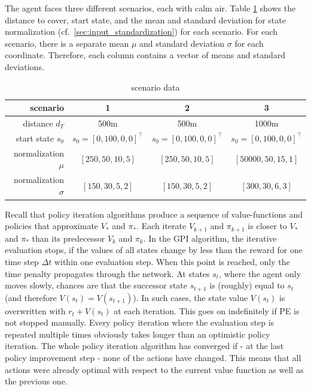 The agent faces three different scenarios, each with calm air. Table \ref{tab:scenario_data} shows the distance to cover, start state, and the mean and standard deviation for state normalization (cf.~\ref{sec:input_standardization}) for each scenario. For each scenario, there is a separate mean $\mu$ and standard deviation $\sigma$ for each coordinate. Therefore, each column contains a vector of means and standard deviations.

\begin{table}[h]
	\begin{center}
		\begin{tabular}{r|c c c}
			scenario & 1 & 2 & 3 \\ \hline
			distance $d_T$ & 500m & 500m & 1000m\\
			start state $s_0$ & $s_0 = [0, 100, 0, 0]^\top$ &  $s_0 = [0, 100, 0, 0]^\top$  &  $s_0 = [0, 100, 0, 0]^\top$  \\
			normalization $\mu$ & $[250, 50, 10, 5]$  &$[250, 50, 10, 5]$ & $[50000, 50, 15, 1]$ \\
			normalization $\sigma$ & $[150, 30, 5, 2]$ & $[150, 30, 5, 2]$ & $[300, 30, 6, 3]$
		\end{tabular}
		\caption{scenario data}
		\label{tab:scenario_data}
	\end{center}
\end{table}

Recall that policy iteration algorithms produce a sequence of value-functions and policies that approximate $V_*$ and $\pi_*$. Each iterate $V_{k+1}$ and $\pi_{k+1}$ is closer to $V_*$ and $\pi_*$ than its predecessor $V_k$ and $\pi_k$.
In the GPI algorithm, the iterative evaluation stops, if the values of all states change by less than the reward for one time step $\Delta t$ within one evaluation step. When this point is reached, only the time penalty propagates through the network. At states $s_t$, where the agent only moves slowly, chances are that the successor state $s_{t+1}$ is (roughly) equal to $s_t$ (and therefore $V(s_t)=V(s_{t+1})$). In such cases, the state value $V(s_t)$ is overwritten with $r_t + V(s_t)$ at each iteration. This goes on indefinitely if PE is not stopped manually. Every policy iteration where the evaluation step is repeated multiple times obviously takes longer than an optimistic policy iteration. The whole policy iteration algorithm has converged if - at the last policy improvement step - none of the actions have changed. This means that all actions were already optimal with respect to the current value function as well as the previous one. \smallbreak

